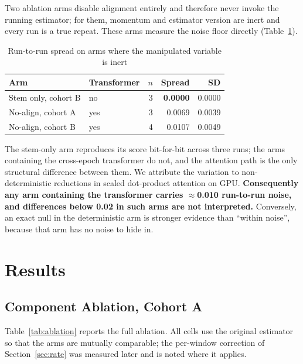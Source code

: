 \documentclass[conference]{IEEEtran}
\begin{document}
Two ablation arms disable alignment entirely and therefore never invoke the
running estimator; for them, momentum and estimator version are inert and every
run is a true repeat. These arms measure the noise floor directly
(Table~\ref{tab:noise}).

\begin{table}[htbp]
\caption{Run-to-run spread on arms where the manipulated variable is inert}
\label{tab:noise}
\centering
\begin{tabular}{llrrr}
\toprule
Arm & Transformer & $n$ & Spread & SD \\
\midrule
Stem only, cohort B      & no  & 3 & \textbf{0.0000} & 0.0000 \\
No-align, cohort A       & yes & 3 & 0.0069 & 0.0039 \\
No-align, cohort B       & yes & 4 & 0.0107 & 0.0049 \\
\bottomrule
\end{tabular}
\end{table}

The stem-only arm reproduces its score bit-for-bit across three runs; the arms
containing the cross-epoch transformer do not, and the attention path is the only
structural difference between them. We attribute the variation to
non-deterministic reductions in scaled dot-product attention on GPU.
\textbf{Consequently any arm containing the transformer carries $\approx$0.010
run-to-run noise, and differences below 0.02 in such arms are not interpreted.}
Conversely, an exact null in the deterministic arm is stronger evidence than
``within noise'', because that arm has no noise to hide in.

\section{Results}

\subsection{Component Ablation, Cohort A}

Table~\ref{tab:ablation} reports the full ablation. All cells use the original
estimator so that the arms are mutually comparable; the per-window correction of
Section~\ref{sec:rate} was measured later and is noted where it applies.
\end{document}
